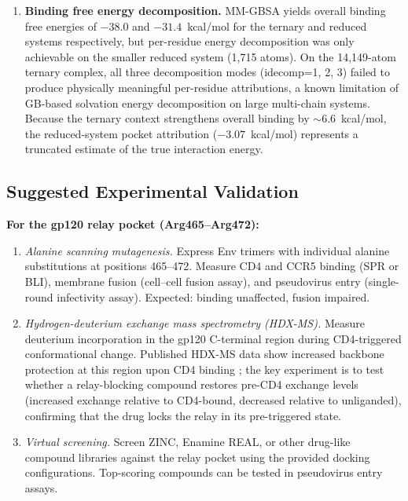 \documentclass[11pt,a4paper]{article}
\begin{document}
\begin{enumerate}[nosep,leftmargin=1.5em]
    \item \textbf{Binding free energy decomposition.} MM-GBSA yields overall binding free energies of $-38.0$ and $-31.4$~kcal/mol for the ternary and reduced systems respectively, but per-residue energy decomposition was only achievable on the smaller reduced system (1,715 atoms). On the 14,149-atom ternary complex, all three decomposition modes (idecomp=1, 2, 3) failed to produce physically meaningful per-residue attributions, a known limitation of GB-based solvation energy decomposition on large multi-chain systems. Because the ternary context strengthens overall binding by ${\sim}6.6$~kcal/mol, the reduced-system pocket attribution ($-3.07$~kcal/mol) represents a truncated estimate of the true interaction energy.
\end{enumerate}

\subsection{Suggested Experimental Validation}

\textbf{For the gp120 relay pocket (Arg465--Arg472):}

\begin{enumerate}[nosep,leftmargin=1.5em]
    \item \textit{Alanine scanning mutagenesis.} Express Env trimers with individual alanine substitutions at positions 465--472. Measure CD4 and CCR5 binding (SPR or BLI), membrane fusion (cell--cell fusion assay), and pseudovirus entry (single-round infectivity assay). Expected: binding unaffected, fusion impaired.

    \item \textit{Hydrogen-deuterium exchange mass spectrometry (HDX-MS).} Measure deuterium incorporation in the gp120 C-terminal region during CD4-triggered conformational change. Published HDX-MS data show increased backbone protection at this region upon CD4 binding \citep{Kong2010,Guttman2012}; the key experiment is to test whether a relay-blocking compound restores pre-CD4 exchange levels (increased exchange relative to CD4-bound, decreased relative to unliganded), confirming that the drug locks the relay in its pre-triggered state.

    \item \textit{Virtual screening.} Screen ZINC, Enamine REAL, or other drug-like compound libraries against the relay pocket using the provided docking configurations. Top-scoring compounds can be tested in pseudovirus entry assays.
\end{enumerate}
\end{document}
